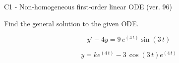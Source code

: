 \begin{exercise}
  \begin{exerciseTitle}C1 - Non-homogeneous first-order linear ODE (ver. 96)\end{exerciseTitle}
  \begin{exerciseStatement}
    
Find the general solution to the given ODE.

    
\[y'-4y= 9 \, e^{\left(4 \, t\right)} \sin\left(3 \, t\right)\]

  \end{exerciseStatement}
  \begin{exerciseAnswer}
    
\[y= k e^{\left(4 \, t\right)} - 3 \, \cos\left(3 \, t\right) e^{\left(4 \, t\right)}\]

  \end{exerciseAnswer}
\end{exercise}